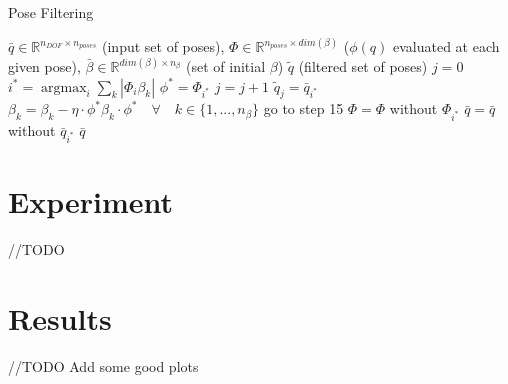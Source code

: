 \documentclass[letterpaper, 10pt, conference]{ieeeconf}
\DeclareMathOperator*{\argmax}{argmax}
\begin{document}
\begin{algorithm}
    \caption{Pose Filtering}
    \begin{algorithmic}[1]
        \renewcommand{\algorithmicrequire}{\textbf{Input:}}
        \renewcommand{\algorithmicensure}{\textbf{Output:}}
        \REQUIRE $\bar{q} \in \mathbb{R}^{n_{DOF} \times n_{poses}}$ (input set
        of poses),
        \newline $\Phi \in \mathbb{R}^{n_{poses} \times dim(\beta)}$ ($\phi(q)$ evaluated at each given pose),
        \newline $\bar{\beta} \in \mathbb{R}^{dim(\beta) \times n_{\beta}}$ (set of initial $\beta$)
        \ENSURE  $\widetilde{q}$ (filtered set of poses)
        \STATE $ j = 0 $
        \STATE $i^* = \argmax_i \sum_k | \Phi_i \beta_k |$
        \STATE $\phi^* = \Phi_{i^{*}}$
        \STATE $j = j + 1$
        \STATE $\widetilde{q}_j = \bar{q}_{i^*} $
        \STATE $\beta_k = \beta_k - \eta \cdot \phi^* \beta_k \cdot \phi^* \quad \forall \quad k \in \{1, ..., n_\beta \}$
        \STATE go to step 15
        \ELSE
        \STATE $\Phi = \Phi $ without $ \Phi_{i^*} $
        \STATE $\bar{q} = \bar{q} $ without $ \bar{q}_{i^*} $
        \ENDIF
        \ENDWHILE
        \RETURN $\bar{q}$
    \end{algorithmic}
\end{algorithm}

\section{Experiment}

//TODO

\section{Results}

//TODO
Add some good plots
\end{document}
